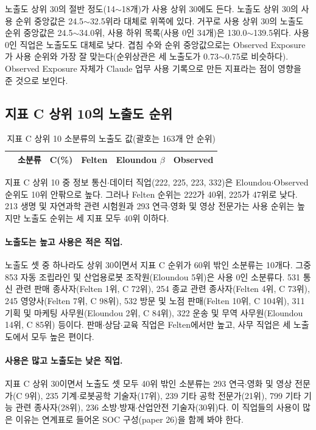 \documentclass[11pt]{article}
\begin{document}
노출도 상위 30의 절반 정도(14$\sim$18개)가 사용 상위 30에도 든다. 노출도 상위 30의 사용 순위 중앙값은 24.5$\sim$32.5위라 대체로 위쪽에 있다. 거꾸로 사용 상위 30의 노출도 순위 중앙값은 24.5$\sim$34.0위, 사용 하위 목록(사용 0인 34개)은 130.0$\sim$139.5위다. 사용 0인 직업은 노출도도 대체로 낮다. 겹침 수와 순위 중앙값으로는 Observed Exposure가 사용 순위와 가장 잘 맞는다(순위상관은 세 노출도가 0.73$\sim$0.75로 비슷하다). Observed Exposure 자체가 Claude 업무 사용 기록으로 만든 지표라는 점이 영향을 준 것으로 보인다.

\subsection{지표 C 상위 10의 노출도 순위}

\begin{small}
\begin{longtable}{R{0.4cm}L{5.4cm}R{1.3cm}R{2.2cm}R{2.4cm}R{2.4cm}}
\caption{지표 C 상위 10 소분류의 노출도 값(괄호는 163개 안 순위)}\label{tab:topc}\\
\toprule
 & 소분류 & C(\%) & Felten & Eloundou $\beta$ & Observed \\
\midrule
\endfirsthead

\bottomrule
\end{longtable}
\end{small}

지표 C 상위 10 중 정보 통신$\cdot$데이터 직업(222, 225, 223, 332)은 Eloundou$\cdot$Observed 순위도 10위 안팎으로 높다. 그러나 Felten 순위는 222가 40위, 225가 47위로 낮다. 213 생명 및 자연과학 관련 시험원과 293 연극$\cdot$영화 및 영상 전문가는 사용 순위는 높지만 노출도 순위는 세 지표 모두 40위 이하다.

\paragraph{노출도는 높고 사용은 적은 직업.} 노출도 셋 중 하나라도 상위 30이면서 지표 C 순위가 60위 밖인 소분류는 10개다. 그중 853 자동 조립라인 및 산업용로봇 조작원(Eloundou 5위)은 사용 0인 소분류다. 531 통신 관련 판매 종사자(Felten 1위, C 72위), 254 종교 관련 종사자(Felten 4위, C 73위), 245 영양사(Felten 7위, C 98위), 532 방문 및 노점 판매(Felten 10위, C 104위), 311 기획 및 마케팅 사무원(Eloundou 2위, C 84위), 322 운송 및 무역 사무원(Eloundou 14위, C 85위) 등이다. 판매$\cdot$상담$\cdot$교육 직업은 Felten에서만 높고, 사무 직업은 세 노출도에서 모두 높은 편이다.

\paragraph{사용은 많고 노출도는 낮은 직업.} 지표 C 상위 30이면서 노출도 셋 모두 40위 밖인 소분류는 293 연극$\cdot$영화 및 영상 전문가(C 9위), 235 기계$\cdot$로봇공학 기술자(17위), 239 기타 공학 전문가(21위), 799 기타 기능 관련 종사자(28위), 236 소방$\cdot$방재$\cdot$산업안전 기술자(30위)다. 이 직업들의 사용이 많은 이유는 연계표로 들어온 SOC 구성(paper 26)을 함께 봐야 한다.
\end{document}
